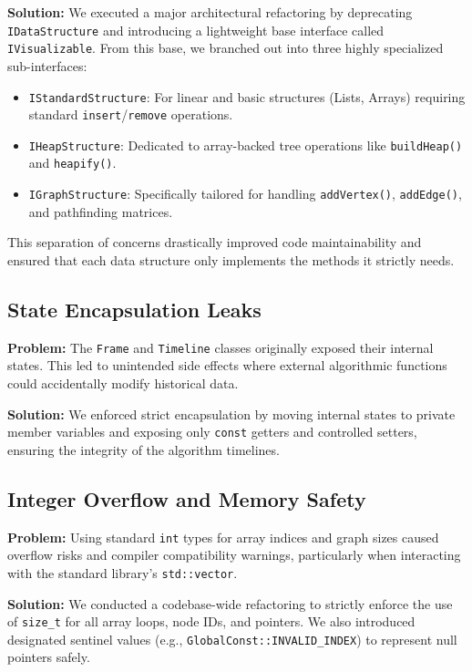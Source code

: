 \textbf{Solution:} We executed a major architectural refactoring by deprecating \texttt{IDataStructure} and introducing a lightweight base interface called \texttt{IVisualizable}. From this base, we branched out into three highly specialized sub-interfaces:
\begin{itemize}
    \item \texttt{IStandardStructure}: For linear and basic structures (Lists, Arrays) requiring standard \texttt{insert}/\texttt{remove} operations.
    \item \texttt{IHeapStructure}: Dedicated to array-backed tree operations like \texttt{buildHeap()} and \texttt{heapify()}.
    \item \texttt{IGraphStructure}: Specifically tailored for handling \texttt{addVertex()}, \texttt{addEdge()}, and pathfinding matrices.
\end{itemize}
This separation of concerns drastically improved code maintainability and ensured that each data structure only implements the methods it strictly needs.

\subsection{State Encapsulation Leaks}
\textbf{Problem:} The \texttt{Frame} and \texttt{Timeline} classes originally exposed their internal states. This led to unintended side effects where external algorithmic functions could accidentally modify historical data.

\textbf{Solution:} We enforced strict encapsulation by moving internal states to private member variables and exposing only \texttt{const} getters and controlled setters, ensuring the integrity of the algorithm timelines.

\subsection{Integer Overflow and Memory Safety}
\textbf{Problem:} Using standard \texttt{int} types for array indices and graph sizes caused overflow risks and compiler compatibility warnings, particularly when interacting with the standard library's \texttt{std::vector}.

\textbf{Solution:} We conducted a codebase-wide refactoring to strictly enforce the use of \texttt{size\_t} for all array loops, node IDs, and pointers. We also introduced designated sentinel values (e.g., \texttt{GlobalConst::INVALID\_INDEX}) to represent null pointers safely.

